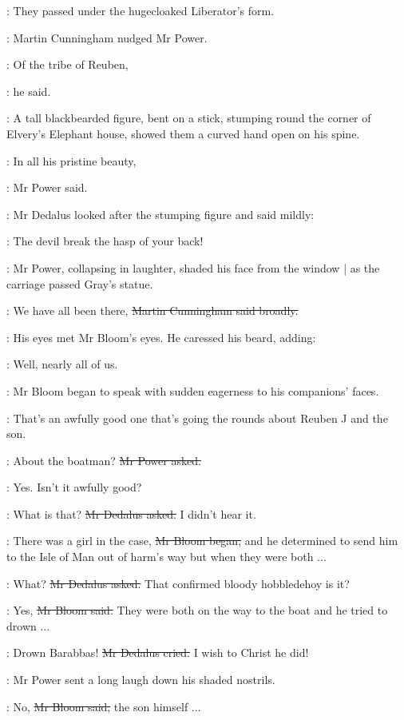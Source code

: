 :
They passed under the hugecloaked Liberator's form.

:
Martin Cunningham nudged Mr Power.

\cunningham:
Of the tribe of Reuben,

:
he said.

:
A tall blackbearded figure, bent on a stick,
stumping round the corner of Elvery's Elephant house,
showed them a curved hand open on his spine.

\power:
In all his pristine beauty,

:
Mr Power said.

:
Mr Dedalus looked after the stumping figure and said mildly:

\simon:
The devil break the hasp of your back!

:
Mr Power, collapsing in laughter,
shaded his face from the window |
as the carriage passed Gray's statue.

\cunningham:
We have all been there,
\sout{Martin Cunningham said broadly.}

:
His eyes met Mr Bloom's eyes.
He caressed his beard, adding:

\cunningham:
Well, nearly all of us.

:
Mr Bloom began to speak with sudden eagerness to his companions' faces.

\Bloom:
That's an awfully good one that's going the rounds
about Reuben J and the son.

\power:
About the boatman?
\sout{Mr Power asked.}

\Bloom:
Yes.
Isn't it awfully good?

\simon:
What is that?
\sout{Mr Dedalus asked.}
I didn't hear it.

\Bloom:
There was a girl in the case,
\sout{Mr Bloom began,}
and he determined to send him
to the Isle of Man out of harm's way
but when they were both ...

\simon:
What?
\sout{Mr Dedalus asked.}
That confirmed bloody hobble\-dehoy is it?

\Bloom:
Yes,
\sout{Mr Bloom said.}
They were both on the way to the boat and he tried to drown ...

\simon:
Drown Barabbas!
\sout{Mr Dedalus cried.}
I wish to Christ he did!

:
Mr Power sent a long laugh down his shaded nostrils.

\Bloom:
No,
\sout{Mr Bloom said,}
the son himself ...

